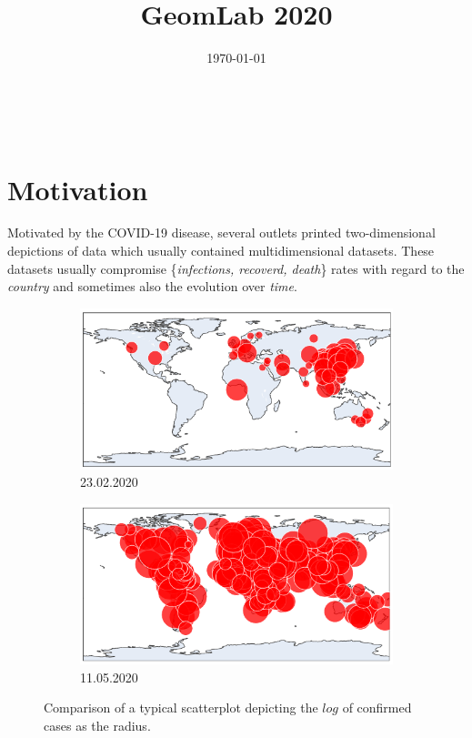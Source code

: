\documentclass[a4paper,11pt]{article}
\makeatletter
\renewcommand{\maketitle}{
  \begin{center}
    \vspace{2ex}
    {\huge \textsc{\@title}}
    \vspace{1ex}
    \\
    \@author \hfill \@date
    \vspace{4ex}
  \end{center}
}
\makeatother
\begin{document}

\title{GeomLab 2020}
\author{}
\date{\today}
\maketitle

\tableofcontents

\newpage

\section{Motivation}

Motivated by the COVID-19 disease, several outlets printed two-dimensional depictions of data which usually contained multidimensional datasets. These datasets usually compromise \{\textit{infections, recoverd, death}\} rates with regard to the \textit{country} and sometimes also the evolution over \textit{time}.\\
%
\begin{figure}[h]
  \begin{subfigure}{0.5\textwidth}
    \includegraphics[width=0.9\linewidth]{covid_spread_20200223.png}
    \caption{23.02.2020}\label{fig:covid2020Feb}
  \end{subfigure}
  \begin{subfigure}{0.5\textwidth}
    \includegraphics[width=0.9\linewidth]{covid_spread_20200511.png}
    \caption{11.05.2020}\label{fig:covid2020May}
  \end{subfigure}
  \caption{Comparison of a typical scatterplot depicting the $log$ of confirmed cases as the radius.}
  \label{fig:covid19}
\end{figure}
\end{document}
